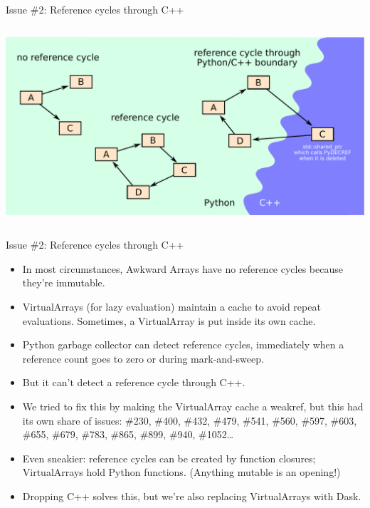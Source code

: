 \documentclass[aspectratio=169]{beamer}
\begin{document}
\begin{frame}{Issue \#2: Reference cycles through C++}
\vspace{0.15 cm}

\begin{columns}
\includegraphics[width=\linewidth]{python-cpp-reference-cycles.pdf}
\end{columns}
\end{frame}

\begin{frame}{Issue \#2: Reference cycles through C++}
\large
\vspace{0.25 cm}
\begin{itemize}\setlength{\itemsep}{0.15 cm}
\item<1-> In most circumstances, Awkward Arrays have no reference cycles because they're immutable.

\item<2-> VirtualArrays (for lazy evaluation) maintain a cache to avoid repeat evaluations. Sometimes, a VirtualArray is put inside its own cache.

\item<3-> Python garbage collector can detect reference cycles, immediately when a reference count goes to zero or during mark-and-sweep.

\item<4-> But it can't detect a reference cycle through C++.

\item<5-> We tried to fix this by making the VirtualArray cache a weakref, but this had its own share of issues: {\normalsize \#230, \#400, \#432, \#479, \#541, \#560, \#597, \#603, \#655, \#679, \#783, \#865, \#899, \#940, \#1052\ldots}

\item<6-> Even sneakier: reference cycles can be created by function closures; VirtualArrays hold Python functions. (Anything mutable is an opening!)

\item<7-> Dropping C++ solves this, but we're also replacing VirtualArrays with Dask.
\end{itemize}
\end{frame}
\end{document}
